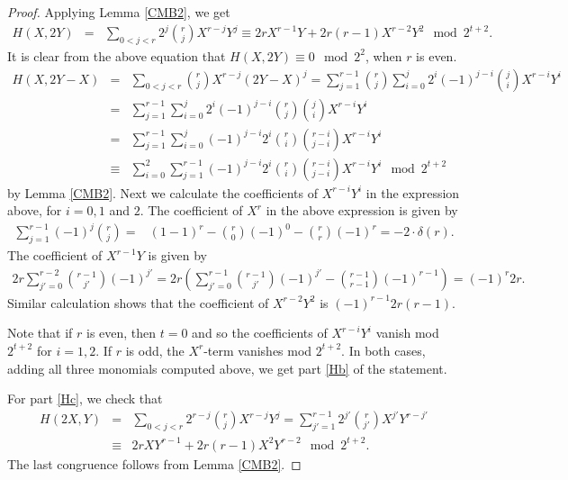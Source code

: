 \documentclass[11pt, reqno]{amsart}
\numberwithin{equation}{section}
\theoremstyle{definition}
\theoremstyle{remark}
\theoremstyle{definition}
\theoremstyle{remark}
\theoremstyle{remark}
\begin{document}
\begin{proof}
Applying Lemma \ref{CMB2}, we get
    \begin{eqnarray*}
   	     H(X,2Y)& = & \displaystyle\sum_{0<j<r}2^{j}{r \choose j}X^{r-j}Y^{j} \equiv 2rX^{r-1}Y +2r(r-1)X^{r-2}Y^{2} \mod 2^{t+2}. 
    \end{eqnarray*}
    It is clear from the above equation that $H(X,2Y) \equiv 0\mod 2^{2}$, when $r$ is even. 
    \begin{eqnarray*}
   	     H(X,2Y-X)& = & \displaystyle\sum_{0<j<r}{r \choose j}X^{r-j}(2Y-X)^{j} =  \displaystyle\sum_{j=1}^{r-1}{r \choose j}\sum_{i=0}^{j}2^{i}(-1)^{j-i}{j \choose i}X^{r-i}Y^{i}	     	\\
         &=&  \displaystyle\sum_{j=1}^{r-1}\sum_{i=0}^{j}2^{i}(-1)^{j-i}{r \choose j}{j \choose i}X^{r-i}Y^{i}	 \\&=&\sum_{j=1}^{r-1}\sum_{i=0}^{j}(-1)^{j-i}2^{i}{r \choose i}{r-i \choose j-i}X^{r-i}Y^{i}	 \\
         &\equiv &\sum_{i=0}^{2}\sum_{j=1}^{r-1}(-1)^{j-i}2^{i}{r \choose i}{r-i \choose j-i}X^{r-i}Y^{i}	\mod 2^{t+2}
         \end{eqnarray*}
         by Lemma \ref{CMB2}. Next we calculate the coefficients of $X^{r-i}Y^i$ in the expression above, for $i=0,1$ and $2$.
    The coefficient of $X^{r}$ in the above expression is given by 
   	   \begin{align*}
   	    \displaystyle \sum_{j=1}^{r-1}(-1)^j{r \choose j}= & (1-1)^{r}- {r \choose 0}(-1)^{0} - {r \choose r}(-1)^{r}	= -2 \cdot \delta(r).
      \end{align*}
   The coefficient of $X^{r-1}Y$ is given by 
   \begin{align*}
     2r\displaystyle \sum_{j'=0}^{r-2}{r-1 \choose j'}(-1)^{j'} = 2r\left(\sum_{j'=0}^{r-1}{r-1 \choose j'}(-1)^{j'}- {r-1 \choose r-1}(-1)^{r-1}\right)
     = (-1)^r2r.
   \end{align*}
Similar calculation shows that the coefficient of $X^{r-2}Y^{2}$ is $ (-1)^{r-1}2r(r-1).$


Note that if $r$ is even, then $t=0$ and so the coefficients of $X^{r-i}Y^i$ vanish mod $2^{t+2}$ for $i=1,2$. If $r$ is odd, the $X^r$-term vanishes mod $2^{t+2}$. In both cases, adding all three monomials computed above, we get part \ref{Hb} of the statement.

For part \ref{Hc}, we check that
\begin{eqnarray*}
H(2X,Y) &= &\displaystyle\sum_{0<j<r}2^{r-j}{r \choose j}X^{r-j}Y^{j} = \displaystyle\sum_{j'=1}^{r-1}2^{j'}{r \choose j'}X^{j'}Y^{r-j'}\\ 
   	   &\equiv& 2rXY^{r-1}+2r(r-1)X^{2}Y^{r-2} \mod 2^{t+2}.
\end{eqnarray*}
  The last congruence follows from Lemma \ref{CMB2}.	   
\end{proof}
\end{document}
